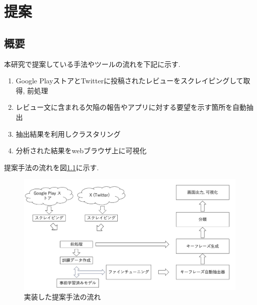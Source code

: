 \chapter{提案}
\label{chap:teian}


\section{概要}
本研究で提案している手法やツールの流れを下記に示す. 

\begin{enumerate}
  \item Google PlayストアとTwitterに投稿されたレビューをスクレイピングして取得, 前処理
  \item レビュー文に含まれる欠陥の報告やアプリに対する要望を示す箇所を自動抽出
  \item 抽出結果を利用しクラスタリング
  \item 分析された結果をwebブラウザ上に可視化
\end{enumerate}

提案手法の流れを図\ref{fig:nagare}に示す. 

\begin{figure}[hbtp]
  \centering
  \includegraphics[width=\linewidth]
       {contents/images/zisso_nagare.png}
  \caption{実装した提案手法の流れ\label{fig:nagare}}
\end{figure}


